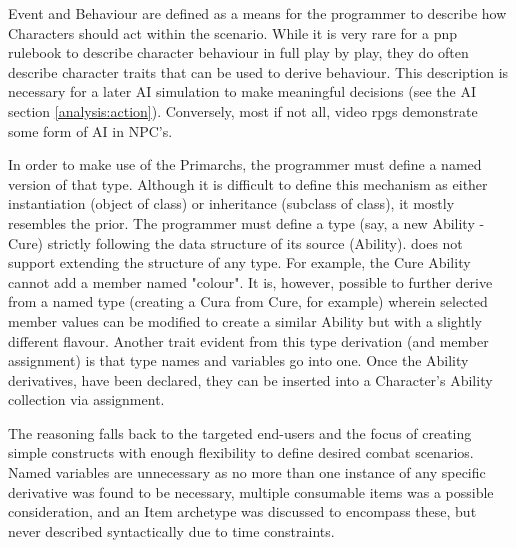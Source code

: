 Event and Behaviour are defined as a means for the programmer to describe how Characters should act within the scenario. While it is very rare for a \ac{pnp} rulebook to describe character behaviour in full play by play, they do often describe character traits that can be used to derive behaviour. This description is necessary for a later AI simulation to make meaningful decisions (see the AI section \vref{analysis:action}). %
Conversely, most if not all, video \ac{rpgs} demonstrate some form of AI in NPC's. 

In order to make use of the Primarchs, the programmer must define a named version of that type. Although it is difficult to define this mechanism as either instantiation (object of class) or inheritance (subclass of class), it mostly resembles the prior. The programmer must define a type (say, a new Ability - Cure) strictly following the data structure of its source (Ability). \langname{} does not support extending the structure of any type. For example, the Cure Ability cannot add a member named "colour". It is, however, possible to further derive from a named type (creating a Cura from Cure, for example) wherein selected member values can be modified to create a similar Ability but with a slightly different flavour. Another trait evident from this type derivation (and member assignment) is that type names and variables go into one. Once the Ability derivatives, have been declared, they can be inserted into a Character's Ability collection via assignment.

The reasoning falls back to the targeted end-users and the focus of creating simple constructs with enough flexibility to define desired combat scenarios. Named variables are unnecessary as no more than one instance of any specific derivative was found to be necessary, multiple consumable items was a possible consideration, and an Item archetype was discussed to encompass these, but never described syntactically due to time constraints.
